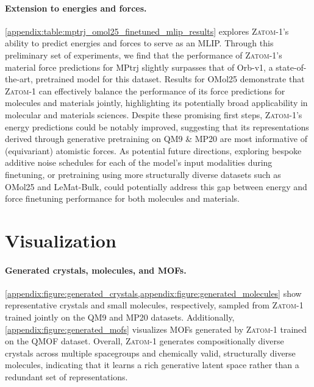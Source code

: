 \documentclass{article}
\theoremstyle{plain}
\theoremstyle{definition}
\theoremstyle{remark}
\begin{document}
\paragraph{Extension to energies and forces.} \cref{appendix:table:mptrj_omol25_finetuned_mlip_results} explores \textsc{Zatom-1}'s ability to predict energies and forces to serve as an MLIP. Through this preliminary set of experiments, we find that the performance of \textsc{Zatom-1}'s material force predictions for MPtrj slightly surpasses that of Orb-v1, a state-of-the-art, pretrained model for this dataset. Results for OMol25 demonstrate that \textsc{Zatom-1} can effectively balance the performance of its force predictions for molecules and materials jointly, highlighting its potentially broad applicability in molecular and materials sciences. Despite these promising first steps, \textsc{Zatom-1}'s energy predictions could be notably improved, suggesting that its representations derived through generative pretraining on QM9 \& MP20 are most informative of (equivariant) atomistic forces. As potential future directions, exploring bespoke additive noise schedules for each of the model's input modalities during finetuning, or pretraining using more structurally diverse datasets such as OMol25 and LeMat-Bulk, could potentially address this gap between energy and force finetuning performance for both molecules and materials.

\section{Visualization}
\label{appendix:visualization}


\paragraph{Generated crystals, molecules, and MOFs.} \cref{appendix:figure:generated_crystals,appendix:figure:generated_molecules} show representative crystals and small molecules, respectively, sampled from \textsc{Zatom-1} trained jointly on the QM9 and MP20 datasets. Additionally, \cref{appendix:figure:generated_mofs} visualizes MOFs generated by \textsc{Zatom-1} trained on the QMOF dataset. Overall, \textsc{Zatom-1} generates compositionally diverse crystals across multiple spacegroups and chemically valid, structurally diverse molecules, indicating that it learns a rich generative latent space rather than a redundant set of representations.
\end{document}
